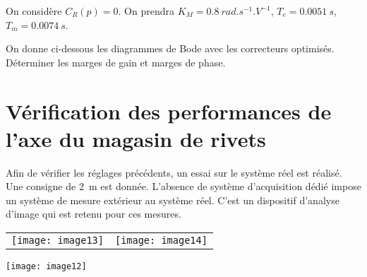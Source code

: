 \begin{multicols}{2}
\fi
 

\ifprof
\begin{corrige}
\end{corrige}
\else
\fi

\ifprof
\else

On considère $C_R (p)=0$. On prendra $K_M=\SI{0,8}{rad.s^{-1}.V^{-1}}$, $T_e=\SI{0,0051}{s}$,$T_m=\SI{0,0074}{s}$.
\fi

\ifprof
\begin{corrige}
\end{corrige}
\else
\fi
 
\ifprof
\begin{corrige}
\end{corrige}
\else
\fi

\ifprof
\else

On donne ci-dessous les diagrammes de Bode avec les correcteurs optimisés. Déterminer les marges de gain et marges de phase. 
\fi

\section*{Vérification des performances de l'axe du magasin de rivets}
\ifprof
\else

Afin de vérifier les réglages précédents, un essai sur le système réel est réalisé. Une consigne de \SI{2}{m} est donnée. L'absence de système d'acquisition dédié impose un système de mesure extérieur au système réel. C'est un dispositif d'analyse d'image qui est retenu pour ces mesures.
\fi

\ifprof
\begin{corrige}
\end{corrige}
\else
\fi
 
\end{multicols}

\ifprof
\else

\begin{center}
\begin{tabular}{cc}
\texttt{[image: image13]} &
\texttt{[image: image14]}

\end{tabular}
\end{center}

 \begin{center}
\texttt{[image: image12]}
\end{center} 
\fi




